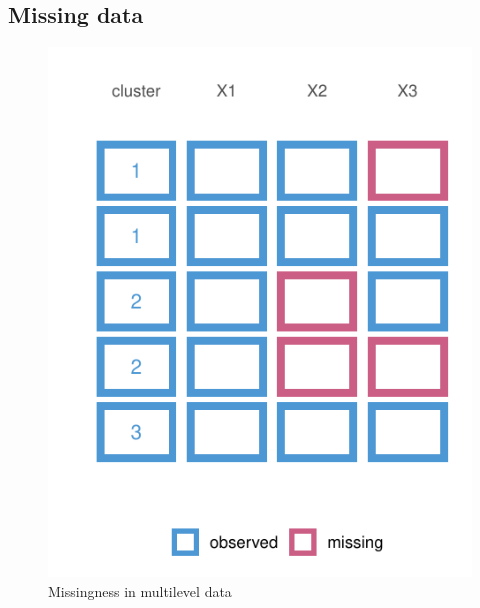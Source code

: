 \documentclass[
]{jss}
\begin{document}
\hypertarget{missing-data}{%
\subsection{Missing data}\label{missing-data}}

\begin{CodeChunk}
\begin{figure}

{\centering \includegraphics{Manuscript_files/figure-latex/patterns-1} 

}

\caption[Missingness in multilevel data]{Missingness in multilevel data}\label{fig:patterns}
\end{figure}
\end{CodeChunk}
\end{document}
